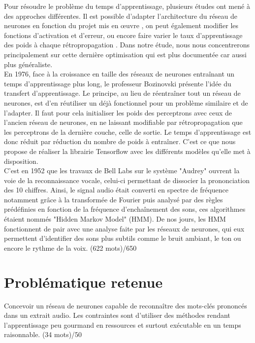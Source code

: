\documentclass[12pt,a4paper, french]{article}
\begin{document}
Pour résoudre le problème du temps d’apprentissage, plusieurs études ont mené à des approches différentes. Il est possible d'adapter l'architecture du réseau de neurones en fonction du projet mis en \oe{}uvre \cite{typeNeuralNetworks}, on peut également modifier les fonctions d’activation et d’erreur, ou encore faire varier le taux d’apprentissage des poids à chaque rétropropagation \cite{gradientDescent}. Dans notre étude, nous nous concentrerons principalement sur cette dernière optimisation qui est plus documentée car aussi plus généraliste. \cite{bishop:2006:PRML} \medskip
\\
En 1976, face à la croissance en taille des réseaux de neurones entraînant un temps d’apprentissage plus long, le professeur Bozinovski présente l'idée du transfert d'apprentissage. \cite{bozinovski2020reminder} Le principe, au lieu de réentraîner tout un réseau de neurones, est d'en réutiliser un déjà fonctionnel pour un problème similaire et de l'adapter. Il faut pour cela initialiser les poids des perceptrons avec ceux de l'ancien réseau de neurones, en ne laissant modifiable par rétropropagation que les perceptrons de la dernière couche, celle de sortie. Le temps d'apprentissage est donc réduit par réduction du nombre de poids à entraîner. C'est ce que nous propose de réaliser la librairie Tensorflow avec les différents modèles qu'elle met à disposition. \cite{tf} \medskip
\\
C'est en 1952 que les travaux de Bell Labs sur  le système "Audrey" ouvrent la voie de la reconnaissance vocale, celui-ci permettant de dissocier la prononciation des 10 chiffres. Ainsi, le signal audio était converti en spectre de fréquence notamment grâce à la transformée de Fourier puis analysé par des règles prédéfinies en fonction de la fréquence d'enchaînement des sons, ces algorithmes étaient nommés "Hidden Markov Model" (HMM). \citep{juang1991hidden} De nos jours, les HMM fonctionnent de pair avec une analyse faite par les réseaux de neurones, qui eux permettent d'identifier des sons plus subtils comme le bruit ambiant, le ton ou encore le rythme de la voix. \citep{audioNN}
(622 mots)/650


\section*{Problématique retenue}
Concevoir un réseau de neurones capable de reconnaître des mots-clés prononcés dans un extrait audio. Les contraintes sont d'utiliser des méthodes rendant l'apprentissage peu gourmand en ressources et surtout exécutable en un temps raisonnable. 
(34 mots)/50
\end{document}
